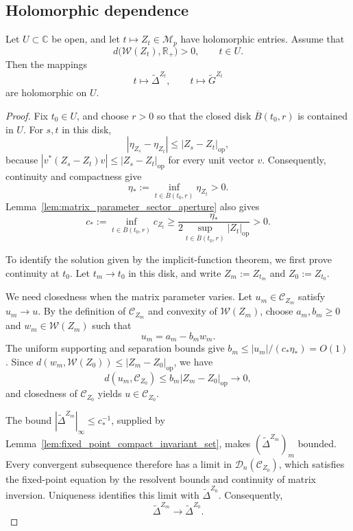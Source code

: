 \documentclass[EJP, preprint, NODS, nobera, nofontexpansion]{ejpecp}
\DeclareMathOperator{\op}{op}
\begin{document}
\subsection{Holomorphic dependence}


\begin{proposition}
\label{pro:matrix_parameter_analyticity}
Let \(U\subset\mathbb C\) be open, and let
\(t\mapsto Z_t\in\mathcal M_p\) have holomorphic entries.
Assume that
\[
    d\bigl(\mathcal W(Z_t),\mathbb R_+\bigr)>0,
    \qquad t\in U.
\]
Then the mappings
\[
    t\longmapsto\widetilde\Delta^{Z_t},
    \qquad
    t\longmapsto\widetilde G^{Z_t}
\]
are holomorphic on \(U\).
\end{proposition}

\begin{proof}
Fix \(t_0\in U\), and choose \(r>0\) so that the closed disk
\(\overline B(t_0,r)\) is contained in \(U\). For \(s,t\) in this disk,
\[
    |\eta_{Z_s}-\eta_{Z_t}|\leq |Z_s-Z_t|_{\op},
\]
because \(|v^*(Z_s-Z_t)v|\leq|Z_s-Z_t|_{\op}\) for every unit vector
\(v\). Consequently, continuity and compactness give
\[
    \eta_*:=\inf_{t\in\overline B(t_0,r)}\eta_{Z_t}>0.
\]
Lemma~\ref{lem:matrix_parameter_sector_aperture} also gives
\[
    c_*:=\inf_{t\in\overline B(t_0,r)}c_{Z_t}
    \geq
    \frac{\eta_*}
    {2\sup_{t\in\overline B(t_0,r)}|Z_t|_{\op}}
    >0.
\]

To identify the solution given by the implicit-function theorem,
we first prove continuity at \(t_0\). Let \(t_m\to t_0\) in this disk,
and write \(Z_m:=Z_{t_m}\) and \(Z_0:=Z_{t_0}\).

We need closedness when the matrix parameter varies.
Let \(u_m\in\mathcal C_{Z_m}\) satisfy \(u_m\to u\).
By the definition of \(\mathcal C_{Z_m}\) and convexity of \(\mathcal W(Z_m)\),
choose \(a_m,b_m\geq0\) and \(w_m\in\mathcal W(Z_m)\) such that
\[
    u_m=a_m-b_mw_m.
\]
The uniform supporting and separation
bounds give \(b_m\leq |u_m|/(c_*\eta_*)=O(1)\).
Since \(d(w_m,\mathcal W(Z_0))\leq|Z_m-Z_0|_{\op}\), we have
\[
    d(u_m,\mathcal C_{Z_0})
    \leq b_m|Z_m-Z_0|_{\op}\longrightarrow0,
\]
and closedness of \(\mathcal C_{Z_0}\) yields
\(u\in\mathcal C_{Z_0}\).

The bound \(|\widetilde\Delta^{Z_m}|_\infty\leq c_*^{-1}\),
supplied by Lemma~\ref{lem:fixed_point_compact_invariant_set}, makes
\((\widetilde\Delta^{Z_m})_m\) bounded.
Every convergent subsequence therefore has a limit in
\(\mathcal D_n(\mathcal C_{Z_0})\), which satisfies the fixed-point
equation by the resolvent bounds and continuity of matrix inversion.
Uniqueness identifies this limit with \(\widetilde\Delta^{Z_0}\).
Consequently,
\[
    \widetilde\Delta^{Z_m}\longrightarrow
    \widetilde\Delta^{Z_0}.
\]


\end{proof}
\end{document}
